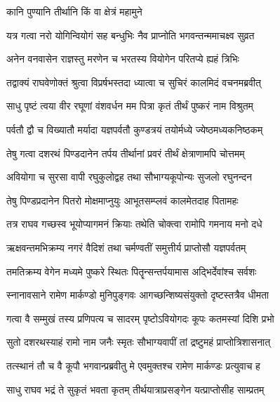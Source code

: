 


\onelineshloka
{कानि पुण्यानि तीर्थानि किं वा क्षेत्रं महामुने} %

\twolineshloka
{यत्र गत्वा नरो योगिन्वियोगं सह बन्धुभिः}
{नैव प्राप्नोति भगवन्तन्ममाचक्ष्व सुव्रत} %

\twolineshloka
{अनेन वनवासेन राज्ञस्तु मरणेन च}
{भरतस्य वियोगेन परितप्ये ह्यहं त्रिभिः} %

\twolineshloka
{तद्वाक्यं राघवेणोक्तं श्रुत्वा विप्रर्षभस्तदा}
{ध्यात्वा च सुचिरं कालमिदं वचनमब्रवीत्} %



\twolineshloka
{साधु पृष्टं त्वया वीर रघूणां वंशवर्धन}
{मम पित्रा कृतं तीर्थं पुष्करं नाम विश्रुतम्} %

\twolineshloka
{पर्वतौ द्वौ च विख्यातौ मर्यादा यज्ञपर्वतौ}
{कुण्डत्रयं तयोर्मध्ये ज्येष्ठमध्यकनिष्ठकम्} %

\twolineshloka
{तेषु गत्वा दशरथं पिण्डदानेन तर्पय}
{तीर्थानां प्रवरं तीर्थं क्षेत्राणामपि चोत्तमम्} %

\twolineshloka
{अवियोगा च सुरसा वापी रघुकुलोद्वह}
{तथा सौभाग्यकूपोन्यः सुजलो रघुनन्दन} %

\twolineshloka
{तेषु पिण्डप्रदानेन पितरो मोक्षमाप्नुयुः}
{आभूतसम्प्लवं कालमेतदाह पितामहः} %

\twolineshloka
{तत्र राघव गच्छस्व भूयोप्यागमनं क्रियाः}
{तथेति चोक्त्वा रामोपि गमनाय मनो दधे} %

\twolineshloka
{ऋक्षवन्तमभिक्रम्य नगरं वैदिशं तथा}
{चर्मण्वतीं समुत्तीर्य प्राप्तोसौ यज्ञपर्वतम्} %

\twolineshloka
{तमतिक्रम्य वेगेन मध्यमे पुष्करे स्थितः}
{पितॄन्सन्तर्पयामास अद्भिर्देवांश्च सर्वशः} %

\twolineshloka
{स्नानावसाने रामेण मार्कण्डो मुनिपुङ्गवः}
{आगच्छन्शिष्यसंयुक्तो दृष्टस्तत्रैव धीमता} %

\twolineshloka
{गत्वा वै सम्मुखं तस्य प्रणिपत्य च सादरम्}
{पृष्टोऽवियोगदः कूपः कतमस्यां दिशि प्रभो} %

\twolineshloka
{सुतो दशरथस्याहं रामो नाम जनैः स्मृतः}
{सौभाग्यवापीं तां द्रष्टुमहं प्राप्तोत्रिशासनात्} %

\twolineshloka
{तत्स्थानं तौ च वै कूपौ भगवान्प्रब्रवीतु मे}
{एवमुक्तश्च रामेण मार्कण्डः प्रत्युवाच ह} %

\twolineshloka
{साधु राघव भद्रं ते सुकृतं भवता कृतम्}
{तीर्थयात्राप्रसङ्गेन यत्प्राप्तोसीह साम्प्रतम्} %

